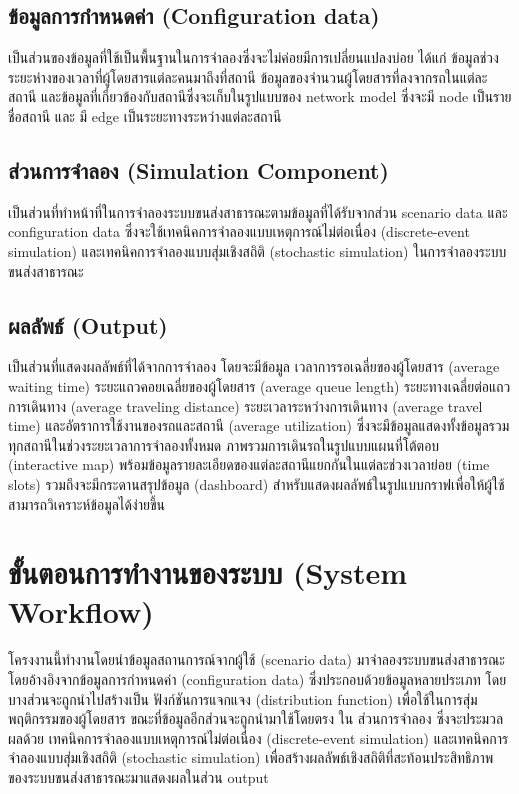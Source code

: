 \subsection{ข้อมูลการกำหนดค่า (Configuration data)}
\begin{mypara}
  \indent เป็นส่วนของข้อมูลที่ใช้เป็นพื้นฐานในการจำลองซึ่งจะไม่ค่อยมีการเปลี่ยนแปลงบ่อย 
  ได้แก่ ข้อมูลช่วงระยะห่างของเวลาที่ผู้โดยสารแต่ละคนมาถึงที่สถานี ข้อมูลของจำนวนผู้โดยสารที่ลงจากรถในแต่ละสถานี 
  และข้อมูลที่เกี่ยวข้องกับสถานีซึ่งจะเก็บในรูปแบบของ network model ซึ่งจะมี 
  node เป็นรายชื่อสถานี และ มี edge เป็นระยะทางระหว่างแต่ละสถานี
  \end{mypara}
\subsection{ส่วนการจำลอง (Simulation Component)}
\begin{mypara}
  \indent เป็นส่วนที่ทำหน้าที่ในการจำลองระบบขนส่งสาธารณะตามข้อมูลที่ได้รับจากส่วน scenario data 
  และ configuration data ซึ่งจะใช้เทคนิคการจำลองแบบเหตุการณ์ไม่ต่อเนื่อง (discrete-event simulation) และเทคนิคการจำลองแบบสุ่มเชิงสถิติ (stochastic simulation) 
  ในการจำลองระบบขนส่งสาธารณะ 
\end{mypara}
\subsection{ผลลัพธ์ (Output)}
\begin{mypara}
  \indent เป็นส่วนที่แสดงผลลัพธ์ที่ได้จากการจำลอง โดยจะมีข้อมูล เวลาการรอเฉลี่ยของผู้โดยสาร (average waiting time) ระยะแถวคอยเฉลี่ยของผู้โดยสาร (average queue length) 
  ระยะทางเฉลี่ยต่อแถวการเดินทาง (average traveling distance) ระยะเวลาระหว่างการเดินทาง (average travel time) และอัตราการใช้งานของรถและสถานี (average utilization)
  ซึ่งจะมีข้อมูลแสดงทั้งข้อมูลรวมทุกสถานีในช่วงระยะเวลาการจำลองทั้งหมด ภาพรวมการเดินรถในรูปแบบแผนที่โต้ตอบ (interactive map) พร้อมข้อมูลรายละเอียดของแต่ละสถานีแยกกันในแต่ละช่วงเวลาย่อย (time slots) 
  รวมถึงจะมีกระดานสรุปข้อมูล (dashboard) สำหรับแสดงผลลัพธ์ในรูปแบบกราฟเพื่อให้ผู้ใช้สามารถวิเคราะห์ข้อมูลได้ง่ายขึ้น 
\end{mypara}
\section{ขั้นตอนการทำงานของระบบ (System Workflow)}
\begin{mypara}
    \indent โครงงานนี้ทำงานโดยนำข้อมูลสถานการณ์จากผู้ใช้ (scenario data) มาจำลองระบบขนส่งสาธารณะ 
    โดยอ้างอิงจากข้อมูลการกำหนดค่า (configuration data) ซึ่งประกอบด้วยข้อมูลหลายประเภท 
    โดยบางส่วนจะถูกนำไปสร้างเป็น ฟังก์ชันการแจกแจง (distribution function) เพื่อใช้ในการสุ่มพฤติกรรมของผู้โดยสาร 
    ขณะที่ข้อมูลอีกส่วนจะถูกนำมาใช้โดยตรง ใน ส่วนการจำลอง ซึ่งจะประมวลผลด้วย
    เทคนิคการจำลองแบบเหตุการณ์ไม่ต่อเนื่อง (discrete-event simulation) และเทคนิคการจำลองแบบสุ่มเชิงสถิติ (stochastic simulation) 
    เพื่อสร้างผลลัพธ์เชิงสถิติที่สะท้อนประสิทธิภาพของระบบขนส่งสาธารณะมาแสดงผลในส่วน output
\end{mypara}
